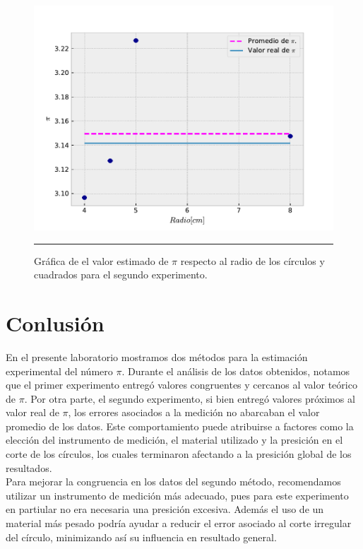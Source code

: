 \documentclass[10pt,a4paper]{article}
\begin{document}
\begin{multicols}{2}
		\begin{figure}[H]
			\centering
			\includegraphics[scale=0.5]{pi_metodo2.pdf}
			\caption{Gráfica de el valor estimado de $\pi$ respecto al radio de los círculos y cuadrados para el segundo experimento.}
			\label{imagen segundo exp}
			\rule{80mm}{0.1mm}
		\end{figure}
	
\section{Conlusión}
En el presente laboratorio mostramos dos métodos para la estimación experimental del número $\pi$. Durante el análisis de los datos obtenidos, notamos que el primer experimento entregó valores congruentes y cercanos al valor teórico de $\pi$. Por otra parte, el segundo experimento, si bien entregó valores próximos al valor real de $\pi$, los errores asociados a la medición no abarcaban el valor promedio de los datos. Este comportamiento puede atribuirse a factores como la elección del instrumento de medición, el material utilizado y la presición en el  corte de los círculos, los cuales terminaron afectando a la presición global de los resultados.\\

Para mejorar la congruencia en los datos del segundo método, recomendamos utilizar un instrumento de medición más adecuado, pues para este experimento en partiular no era necesaria una presición excesiva. Además el  uso de un material más pesado podría ayudar a reducir el error asociado al corte irregular del círculo, minimizando así su influencia en resultado general.\\


\end{multicols}
\end{document}
